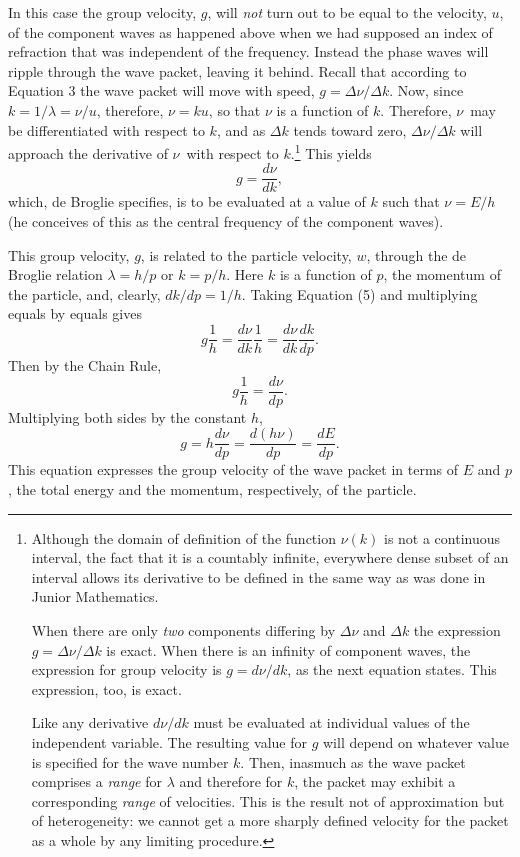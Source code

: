 In this case the group velocity, $g$, will \emph{not} turn out to
be equal to the velocity, $u$, of the component waves as happened
above when we had supposed an index of refraction that was independent
of the frequency. Instead the phase waves will ripple through the wave
packet, leaving it behind. Recall that according to Equation 3 the wave
packet will move with speed, $g = \Delta\nu/\Delta k$. Now, since
$k = 1/\lambda = \nu/u$, therefore,
$\nu = ku$, so that $\nu$ is a function of $k$.
Therefore, $\nu$~may be differentiated with respect to $k$, and
as $\Delta k$ tends toward zero, $\Delta\nu/\Delta k$ will approach the
derivative of $\nu$~with respect to $k$.\footnote{Although the
  domain of definition of the function $\nu(k)$ is not a
  continuous interval, the fact that it is a countably infinite,
  everywhere dense subset of an interval allows its derivative to be
  defined in the same way as was done in Junior Mathematics.

  When there are only \emph{two} components differing by $\Delta\nu$ and
  $\Delta k$ the expression $g = \Delta\nu/\Delta k$ is exact. When
  there is an infinity of component waves, the expression for group
  velocity is $g = d\nu/dk$, as the next equation states. This
  expression, too, is exact.

  Like any derivative $d\nu/dk$ must be evaluated at individual
  values of the independent variable. The resulting value for $g$
  will depend on whatever value is specified for the wave number
  $k$. Then, inasmuch as the wave packet comprises a \emph{range}
  for $\lambda$ and therefore for $k$, the packet may exhibit a
  corresponding \emph{range} of velocities. This is the result not of
  approximation but of heterogeneity: we cannot get a more sharply
  defined velocity for the packet as a whole by any limiting procedure.}
This yields
\begin{equation*}\tag{5}
g = \frac{d\nu}{dk} ,
\end{equation*}
which, de Broglie specifies, is to be evaluated at a value of $k$
such that $\nu = E/h$ (he conceives of this as the
central frequency of the component waves).

This group velocity, $g$, is related to the particle velocity,
$w$, through the de Broglie relation $\lambda = h/p$
or $k = p/h$. Here $k$ is a function of
$p$, the momentum of the particle, and, clearly, $dk/dp=1/h$.
Taking Equation (5) and multiplying equals by equals gives
\begin{equation*}
g\frac{1}{h} = \frac{d\nu}{dk}\frac{1}{h} = \frac{d\nu}{dk}\frac{dk}{dp}.
\end{equation*}
Then by the Chain Rule,
\begin{equation*}
g\frac{1}{h} = \frac{d\nu}{dp}.
\end{equation*}
Multiplying both sides by the constant $h$,
\begin{equation*}
g = h\frac{d\nu}{dp} = \frac{d(h\nu)}{dp} = \frac{dE}{dp}.
\end{equation*}
This equation expresses the group velocity of the wave packet in terms
of $E$ and $p$, the total energy and the momentum,
respectively, of the particle.

